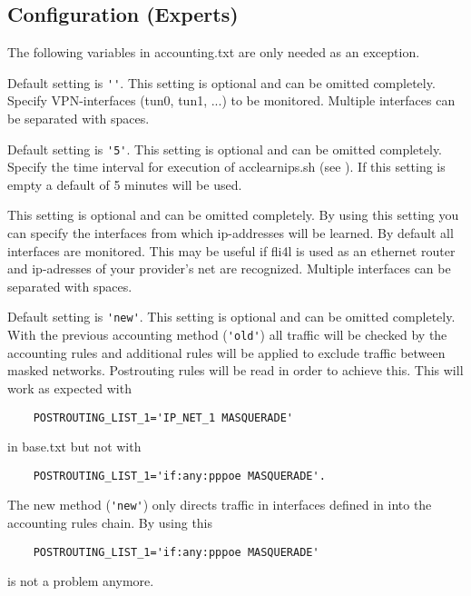 \subsection{Configuration (Experts)}
The following variables in accounting.txt are only needed as an exception.

\begin{description}

Default setting is \verb*?''?.
This setting is optional and can be omitted completely. 
Specify VPN-interfaces (tun0, tun1, ...) to be monitored. Multiple
interfaces can be separated with spaces.

Default setting is \verb*?'5'?.
This setting is optional and can be omitted completely. 
Specify the time interval for  execution of acclearnips.sh (see
).
If this setting is empty a default of 5 minutes will be used.

This setting is optional and can be omitted completely. 
By using this setting you can specify the interfaces from which ip-addresses will 
be learned. By default all interfaces are monitored. This may be useful if fli4l 
is used as an ethernet router and ip-adresses of your provider's net are recognized.
Multiple interfaces can be separated with spaces.

Default setting is \verb*?'new'?.
This setting is optional and can be omitted completely. 
With the previous accounting method (\verb*?'old'?) all traffic will be 
checked by the accounting rules and additional rules will be applied to exclude
traffic between masked networks. Postrouting rules will be read in order 
to achieve this. This will work as expected with
\begin{example}
\begin{verbatim}
    POSTROUTING_LIST_1='IP_NET_1 MASQUERADE'
\end{verbatim}
\end{example}
in base.txt but not with
\begin{example}
\begin{verbatim}
    POSTROUTING_LIST_1='if:any:pppoe MASQUERADE'.
\end{verbatim}
\end{example}
The new method (\verb*?'new'?) only directs traffic in interfaces defined in
into the accounting rules chain. By using this 
\begin{example}
\begin{verbatim}
    POSTROUTING_LIST_1='if:any:pppoe MASQUERADE'
\end{verbatim}
\end{example}
is not a problem anymore.


\end{description}
